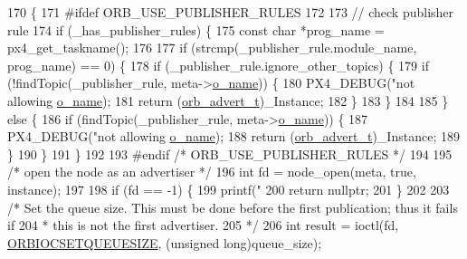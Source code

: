\begin{DoxyCode}
170 \{
171 \textcolor{preprocessor}{#ifdef ORB\_USE\_PUBLISHER\_RULES}
172 
173     \textcolor{comment}{// check publisher rule}
174     \textcolor{keywordflow}{if} (\_has\_publisher\_rules) \{
175         \textcolor{keyword}{const} \textcolor{keywordtype}{char} *prog\_name = px4\_get\_taskname();
176 
177         \textcolor{keywordflow}{if} (strcmp(\_publisher\_rule.module\_name, prog\_name) == 0) \{
178             \textcolor{keywordflow}{if} (\_publisher\_rule.ignore\_other\_topics) \{
179                 \textcolor{keywordflow}{if} (!findTopic(\_publisher\_rule, meta->\hyperlink{structorb__metadata_a54d1751f24aa0c1f24934c6712811e58}{o\_name})) \{
180                     PX4\_DEBUG(\textcolor{stringliteral}{"not allowing %
      \hyperlink{structorb__metadata_a54d1751f24aa0c1f24934c6712811e58}{o\_name});
181                     \textcolor{keywordflow}{return} (\hyperlink{uORB_8h_a8d0cfa5f9ea6427a37057d6cea6dd990}{orb\_advert\_t})\_Instance;
182                 \}
183             \}
184 
185         \} \textcolor{keywordflow}{else} \{
186             \textcolor{keywordflow}{if} (findTopic(\_publisher\_rule, meta->\hyperlink{structorb__metadata_a54d1751f24aa0c1f24934c6712811e58}{o\_name})) \{
187                 PX4\_DEBUG(\textcolor{stringliteral}{"not allowing %
      \hyperlink{structorb__metadata_a54d1751f24aa0c1f24934c6712811e58}{o\_name});
188                 \textcolor{keywordflow}{return} (\hyperlink{uORB_8h_a8d0cfa5f9ea6427a37057d6cea6dd990}{orb\_advert\_t})\_Instance;
189             \}
190         \}
191     \}
192 
193 \textcolor{preprocessor}{#endif }\textcolor{comment}{/* ORB\_USE\_PUBLISHER\_RULES */}\textcolor{preprocessor}{}
194 
195     \textcolor{comment}{/* open the node as an advertiser */}
196     \textcolor{keywordtype}{int} fd = node\_open(meta, \textcolor{keyword}{true}, instance);
197 
198     \textcolor{keywordflow}{if} (fd == -1) \{
199         printf(\textcolor{stringliteral}{"%
200         \textcolor{keywordflow}{return} \textcolor{keyword}{nullptr};
201     \}
202 
203     \textcolor{comment}{/* Set the queue size. This must be done before the first publication; thus it fails if}
204 \textcolor{comment}{     * this is not the first advertiser.}
205 \textcolor{comment}{     */}
206     \textcolor{keywordtype}{int} result = ioctl(fd, \hyperlink{drv__orb__dev_8h_a4835f9286d5aac7a6b5e0a01661cbee7}{ORBIOCSETQUEUESIZE}, (\textcolor{keywordtype}{unsigned} \textcolor{keywordtype}{long})queue\_size);
}}}
\end{DoxyCode}
